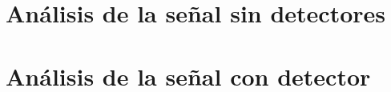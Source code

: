 \documentclass[12pt]{report}
\begin{document}
	\section{Análisis de la señal sin detectores}
	
	
	\section{Análisis de la señal con detector}
    
    
    
  

    








\end{document}
